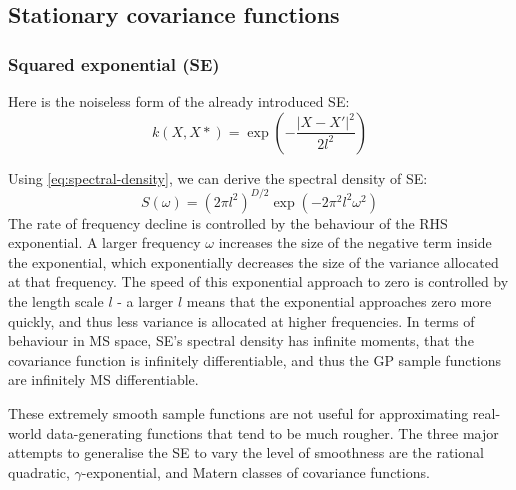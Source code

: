 \subsection{Stationary covariance functions}

\subsubsection{Squared exponential (SE)}
Here is the noiseless form of the already introduced SE: \cite{gp-ml}
\begin{equation} \label{eq:se}
    k(X,X*) = \exp \left(- \frac{|X - X'|^2}{2l^2} \right)
\end{equation}

Using \ref{eq:spectral-density}, we can derive the spectral density of SE: \cite{gp-ml} 
\begin{equation} \label{eq:se-sd}
    S(\omega) = (2 \pi l^2)^{D/2} \exp \left(- 2 \pi^2 l^2 \omega^2 \right)
\end{equation}
The rate of frequency decline is controlled by the behaviour of the RHS exponential. A larger frequency $\omega$ increases the size of the negative term inside the exponential, which exponentially decreases the size of the variance allocated at that frequency. 
The speed of this exponential approach to zero is controlled by the length scale $l$ - a larger $l$ means that the exponential approaches zero more quickly, and thus less variance is allocated at higher frequencies. 
In terms of behaviour in MS space, SE's spectral density has infinite moments, that the covariance function is infinitely differentiable, and thus the GP sample functions are infinitely MS differentiable. 

These extremely smooth sample functions are not useful for approximating real-world data-generating functions that tend to be much rougher. The three major attempts to generalise the SE to vary the level of smoothness are the rational quadratic, $\gamma$-exponential, and Matern classes of covariance functions.


